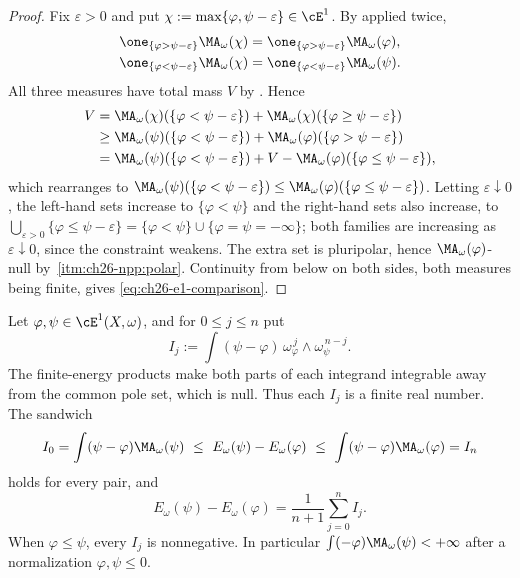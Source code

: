 \begin{proof}
Fix $\varepsilon>0$ and put $\chi:=\max\{\varphi,\psi-\varepsilon\}\in\cE^1$.
By  applied twice,
\[
 \begin{aligned}
 \one_{\{\varphi>\psi-\varepsilon\}}\MA_\omega(\chi)
 &=\one_{\{\varphi>\psi-\varepsilon\}}\MA_\omega(\varphi),\\
 \one_{\{\varphi<\psi-\varepsilon\}}\MA_\omega(\chi)
 &=\one_{\{\varphi<\psi-\varepsilon\}}\MA_\omega(\psi).
 \end{aligned}
\]
All three measures have total mass $V$ by
.  Hence
\[
\begin{split}
 V&=\MA_\omega(\chi)(\{\varphi<\psi-\varepsilon\})
   +\MA_\omega(\chi)(\{\varphi\geq\psi-\varepsilon\})\\
  &\geq\MA_\omega(\psi)(\{\varphi<\psi-\varepsilon\})
   +\MA_\omega(\varphi)(\{\varphi>\psi-\varepsilon\})\\
  &=\MA_\omega(\psi)(\{\varphi<\psi-\varepsilon\})
   +V-\MA_\omega(\varphi)(\{\varphi\leq\psi-\varepsilon\}),
\end{split}
\]
which rearranges to
$\MA_\omega(\psi)(\{\varphi<\psi-\varepsilon\})\leq
\MA_\omega(\varphi)(\{\varphi\leq\psi-\varepsilon\})$.  Letting
$\varepsilon\downarrow0$, the left-hand sets increase to
$\{\varphi<\psi\}$ and the right-hand sets also increase, to
$\bigcup_{\varepsilon>0}\{\varphi\leq\psi-\varepsilon\}
=\{\varphi<\psi\}\cup\{\varphi=\psi=-\infty\}$; both families are
increasing as $\varepsilon\downarrow0$, since the constraint weakens.
The extra set is
pluripolar, hence $\MA_\omega(\varphi)$-null by
\,\cref{itm:ch26-npp:polar}.  Continuity from below
on both sides, both measures being finite, gives
\eqref{eq:ch26-e1-comparison}.
\end{proof}

\begin{proposition}
\label{prop:ch26-e1-cocycle}
Let $\varphi,\psi\in\cE^1(X,\omega)$, and for $0\leq j\leq n$ put
\[
 I_j:=\int(\psi-\varphi)\,
   \omega_\varphi^{\,j}\wedge\omega_\psi^{\,n-j}.
\]
The finite-energy products make both parts of each integrand integrable
away from the common pole set, which is null.  Thus each $I_j$ is a finite
real number.  The sandwich
\begin{equation}
\label{eq:ch26-e1-sandwich}
 I_0=\int(\psi-\varphi)\MA_\omega(\psi)
 \ \leq\ E_\omega(\psi)-E_\omega(\varphi)\ \leq\
 \int(\psi-\varphi)\MA_\omega(\varphi)=I_n
\end{equation}
holds for every pair, and
\begin{equation}
\label{eq:ch26-e1-cocycle}
 E_\omega(\psi)-E_\omega(\varphi)
 =\frac1{n+1}\sum_{j=0}^nI_j.
\end{equation}
When $\varphi\leq\psi$, every $I_j$ is nonnegative.
In particular $\int(-\varphi)\MA_\omega(\psi)<+\infty$ after a
normalization $\varphi,\psi\leq0$.
\end{proposition}

